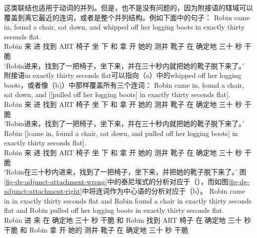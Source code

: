 这类联结也适用于动词的并列。但是，也不是没有问题的，因为附接语的辖域可以覆盖到离它最近的连词，或者是整个并列结构。例如下面\citet[]{Levine2003a}中的句子：
\ea
\gll Robin came in, found a chair, sat down, and whipped off her logging boots in exactly thirty seconds flat.\\
Robin 来 进 找到 ART 椅子 坐 下 和 拿 开 她的 测井 靴子 在 确定地 三十 秒 干脆\\
\glt `Robin进来，找到了一把椅子，坐下来，并在三十秒内就把她的靴子脱下来了。'
\z
附接语in exactly thirty seconds flat可以指向（a）中的whipped off her logging boots，或者像（b)）中那样覆盖所有三个连词：
\eal
\ex 
\gll Robin came in, found a chair, sat down, and [[pulled off her logging boots] in exactly thirty seconds flat].\\
Robin 来 进 找到 ART 椅子 坐 下 和 拿 开 她的 测井 靴子 在 确定地 三十 秒 干脆\\
\glt `Robin进来，找到了一把椅子，坐下来，并在三十秒内就把她的靴子脱下来了。'
\ex\label{ex-Robin-flat-VP}
\gll Robin [[came in, found a chair, sat down, and pulled off her logging boots] in exactly thirty seconds flat].\\
Robin 来 进 找到 ART 椅子 坐 下 和 拿 开 她的 测井 靴子 在 确定地 三十 秒 干脆\\
\glt `Robin在三十秒内进来，找到了一把椅子，坐下来，并把她的靴子脱下来了。'
\zl
图\vref{fig-dg-adjunct-attachment-wrong}中的泰尼埃式的分析对应于（），而如图\vref{fig-dg-adjunct-attachment-right}中将连词作为中心语的分析对应于（b）。
\ea
\gll Robin came in in exactly thirty seconds flat and Robin found a chair in exactly thirty seconds flat
and Robin pulled off her logging boots in exactly thirty seconds flat.\\
Robin 进 来 在 确定地 三十 秒 干脆 和 Robin 找到 ART 椅子 在 确定地 三十 秒 干脆 和 Robin 拿 开 她的 测井 靴子 在 确定地 三十 秒 干脆\\
